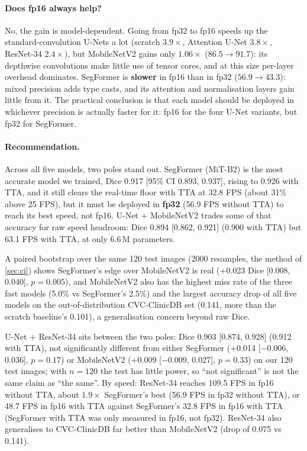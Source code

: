 \paragraph{Does fp16 always help?}
No, the gain is model-dependent. Going from fp32 to fp16 speeds up the standard-convolution U-Nets a lot
(scratch $3.9\times$, Attention U-Net $3.8\times$, ResNet-34 $2.4\times$), but MobileNetV2 gains only $1.06\times$ ($86.5 \rightarrow 91.7$): its
depthwise convolutions make little use of tensor cores, and at this size per-layer overhead dominates.
SegFormer is \textbf{slower} in fp16 than in fp32 ($56.9 \rightarrow 43.3$): mixed precision adds type casts, and its
attention and normalisation layers gain little from it. The practical conclusion is that each model should
be deployed in whichever precision is actually faster for it: fp16 for the four U-Net variants, but fp32
for SegFormer.

\paragraph{Recommendation.}
Across all five models, two poles stand out. SegFormer (MiT-B2) is the most accurate model we trained,
Dice 0.917 [95\% CI 0.893, 0.937], rising to 0.926 with TTA, and it still clears the real-time floor with TTA
at 32.8 FPS (about 31\% above 25 FPS), but it must be deployed in \textbf{fp32} (56.9 FPS without TTA) to reach
its best speed, not fp16. U-Net + MobileNetV2 trades some of that accuracy for raw speed headroom: Dice
0.894 [0.862, 0.921] (0.900 with TTA) but 63.1 FPS with TTA, at only 6.6\,M parameters.

A paired bootstrap over the same 120 test images (2000 resamples, the method of \cref{sec:ci}) shows SegFormer's
edge over MobileNetV2 is real (+0.023 Dice [0.008, 0.040], $p = 0.005$), and MobileNetV2 also has the highest
miss rate of the three fast models (5.0\% vs SegFormer's 2.5\%) and the largest accuracy drop of all five
models on the out-of-distribution CVC-ClinicDB set (0.141, more than the scratch baseline's 0.101), a
generalisation concern beyond raw Dice.

U-Net + ResNet-34 sits between the two poles: Dice 0.903 [0.874, 0.928] (0.912 with TTA), not significantly
different from either SegFormer (+0.014 [$-$0.006, 0.036], $p = 0.17$) or MobileNetV2 (+0.009 [$-$0.009, 0.027],
$p = 0.33$) on our 120 test images; with $n = 120$ the test has little power, so ``not significant'' is not the
same claim as ``the same''. By speed: ResNet-34 reaches 109.5 FPS in fp16 without TTA, about $1.9\times$ SegFormer's
best (56.9 FPS in fp32 without TTA), or 48.7 FPS in fp16 with TTA against SegFormer's 32.8 FPS in fp16 with
TTA (SegFormer with TTA was only measured in fp16, not fp32). ResNet-34 also generalises to CVC-ClinicDB far
better than MobileNetV2 (drop of 0.075 vs 0.141).


